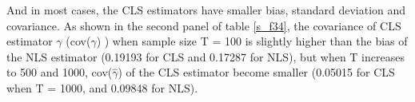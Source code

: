 \documentclass[a4paper,12pt,times,numbered,print,index]{report}
\numberwithin{equation}{section}
\begin{document}
And in most cases, the CLS estimators have smaller bias, standard deviation and covariance. As shown in the second panel of table \ref{s_f34}, the covariance of CLS estimator $\gamma$ (cov($\hat{\gamma}$) ) when sample size T = 100 is slightly higher than the bias of the NLS estimator (0.19193 for CLS and 0.17287 for NLS), but when T increases to 500 and 1000, cov($\hat{\gamma}$) of the CLS estimator become smaller (0.05015 for CLS when T = 1000, and 0.09848 for NLS).


\end{document}
